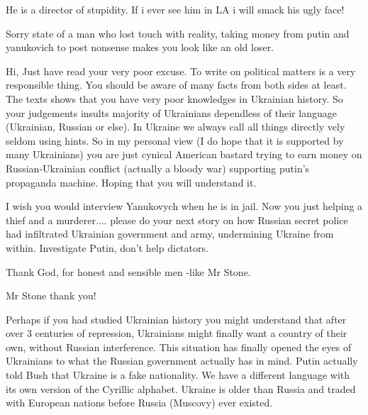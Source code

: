 \begin{itemize}
\begin{itemize} %
He is a director of stupidity. If i ever see him in LA i will smack his ugly face!
\end{itemize} %


Sorry state of a man who lost touch with reality, taking money from putin and
yanukovich to post nonsense makes you look like an old loser.



Hi, Just have read your very poor excuse. To write on political matters is a very
responsible thing. You should be aware of many facts from both sides at least.
The texts shows that you have very poor knowledges in Ukrainian history. So your
judgements insults majority of Ukrainians dependless of their
language (Ukrainian, Russian or else). In Ukraine we always call all things
directly vely seldom using hints. So in my personal view (I do hope that it is
supported by many Ukrainians) you are just cynical American bastard trying to
earn money on Russian-Ukrainian conflict (actually a bloody war) supporting
putin's propaganda machine. Hoping that you will understand it.


I wish you would interview Yanukovych when he is in jail. Now you just helping
a thief and a murderer.... please do your next story on how Russian secret
police had infiltrated Ukrainian government and army, undermining Ukraine from
within. Investigate Putin, don't help dictators.

Thank God, for honest and sensible men -like Mr Stone.

Mr Stone thank you!


Perhaps if you had studied Ukrainian history you might understand that after
over 3 centuries of repression, Ukrainians might finally want a country of
their own, without Russian interference. This situation has finally opened the
eyes of Ukrainians to what the Russian government actually has in mind. Putin
actually told Bush that Ukraine is a fake nationality. We have a different
language with its own version of the Cyrillic alphabet. Ukraine is older than
Russia and traded with European nations before Russia (Muscovy) ever existed.

\begin{itemize} %


\end{itemize}
\end{itemize}
